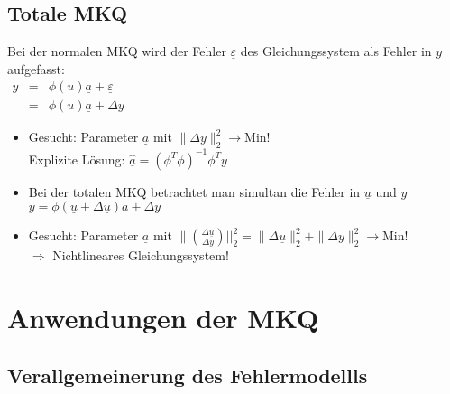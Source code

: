 \documentclass[ngerman]{tudscrreprt}
\begin{document}
\section{Totale MKQ}
Bei der normalen MKQ wird der Fehler $\underline{\varepsilon}$ des Gleichungssystem als Fehler in $y$ aufgefasst:\\
$
\begin{matrix}
y &=& \phi(u)\underline{a} + \underline{\varepsilon} \\
& =& \phi(u)\underline a + \Delta y
\end{matrix}
$
\begin{itemize}
\item Gesucht: Parameter $\underline a$ mit $ \|\Delta y \|_2^2 \rightarrow $Min!\\
Explizite Lösung: $\hat{\underline a} = (\phi^T \phi)^{-1} \phi^T y$
\item Bei der totalen MKQ betrachtet man simultan die Fehler in $\underline u$ und $y$ \\
$ y = \phi(\underline u + \Delta \underline u) a + \Delta y$
\item Gesucht: Parameter $\underline a$ mit 
$
\Big\|\binom{\Delta \underline u}{\Delta y}|\Big|_2^2 = \|\Delta \underline u\|_2^2 + \|\Delta y\|_2^2 \rightarrow 
$Min! \\$\Rightarrow$ Nichtlineares Gleichungssystem!
\end{itemize} 
\newpage
\chapter{Anwendungen der MKQ}
\section{Verallgemeinerung des Fehlermodellls}
\end{document}
